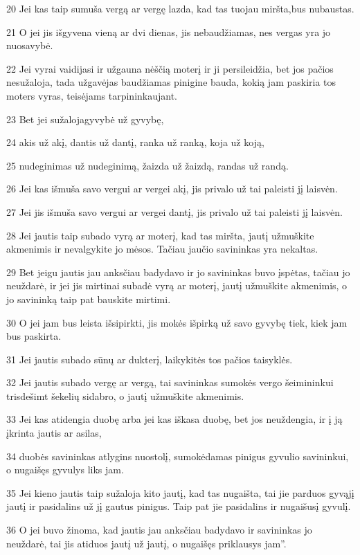 \par 20 Jei kas taip sumuša vergą ar vergę lazda, kad tas tuojau miršta,­bus nubaustas. 
\par 21 O jei jis išgyvena vieną ar dvi dienas, jis nebaudžiamas, nes vergas yra jo nuosavybė. 
\par 22 Jei vyrai vaidijasi ir užgauna nėščią moterį ir ji persileidžia, bet jos pačios nesužaloja, tada užgavėjas baudžiamas pinigine bauda, kokią jam paskiria tos moters vyras, teisėjams tarpininkaujant. 
\par 23 Bet jei sužaloja­gyvybė už gyvybę, 
\par 24 akis už akį, dantis už dantį, ranka už ranką, koja už koją, 
\par 25 nudeginimas už nudeginimą, žaizda už žaizdą, randas už randą. 
\par 26 Jei kas išmuša savo vergui ar vergei akį, jis privalo už tai paleisti jį laisvėn. 
\par 27 Jei jis išmuša savo vergui ar vergei dantį, jis privalo už tai paleisti jį laisvėn. 
\par 28 Jei jautis taip subado vyrą ar moterį, kad tas miršta, jautį užmuškite akmenimis ir nevalgykite jo mėsos. Tačiau jaučio savininkas yra nekaltas. 
\par 29 Bet jeigu jautis jau anksčiau badydavo ir jo savininkas buvo įspėtas, tačiau jo neuždarė, ir jei jis mirtinai subadė vyrą ar moterį, jautį užmuškite akmenimis, o jo savininką taip pat bauskite mirtimi. 
\par 30 O jei jam bus leista išsipirkti, jis mokės išpirką už savo gyvybę tiek, kiek jam bus paskirta. 
\par 31 Jei jautis subado sūnų ar dukterį, laikykitės tos pačios taisyklės. 
\par 32 Jei jautis subado vergę ar vergą, tai savininkas sumokės vergo šeimininkui trisdešimt šekelių sidabro, o jautį užmuškite akmenimis. 
\par 33 Jei kas atidengia duobę arba jei kas iškasa duobę, bet jos neuždengia, ir į ją įkrinta jautis ar asilas, 
\par 34 duobės savininkas atlygins nuostolį, sumokėdamas pinigus gyvulio savininkui, o nugaišęs gyvulys liks jam. 
\par 35 Jei kieno jautis taip sužaloja kito jautį, kad tas nugaišta, tai jie parduos gyvąjį jautį ir pasidalins už jį gautus pinigus. Taip pat jie pasidalins ir nugaišusį gyvulį. 
\par 36 O jei buvo žinoma, kad jautis jau anksčiau badydavo ir savininkas jo neuždarė, tai jis atiduos jautį už jautį, o nugaišęs priklausys jam”.



